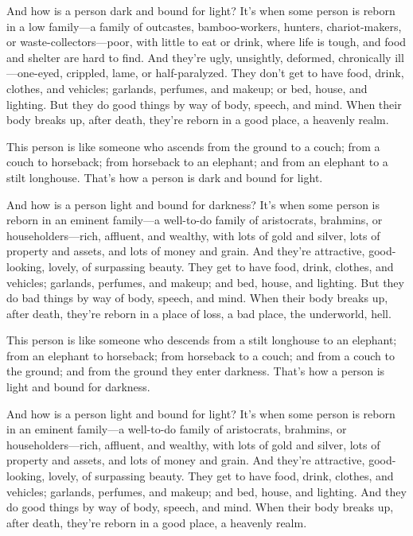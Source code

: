 \documentclass[12pt,openany]{book}%
\begin{document}
And how is a person dark and bound for light? It’s when some person is reborn in a low family—a family of outcastes, bamboo-workers, hunters, chariot-makers, or waste-collectors—poor, with little to eat or drink, where life is tough, and food and shelter are hard to find. And they’re ugly, unsightly, deformed, chronically ill—one-eyed, crippled, lame, or half-paralyzed. They don’t get to have food, drink, clothes, and vehicles; garlands, perfumes, and makeup; or bed, house, and lighting. But they do good things by way of body, speech, and mind. When their body breaks up, after death, they’re reborn in a good place, a heavenly realm. 

This person is like someone who ascends from the ground to a couch; from a couch to horseback; from horseback to an elephant; and from an elephant to a stilt longhouse. That’s how a person is dark and bound for light. 

And how is a person light and bound for darkness? It’s when some person is reborn in an eminent family—a well-to-do family of aristocrats, brahmins, or householders—rich, affluent, and wealthy, with lots of gold and silver, lots of property and assets, and lots of money and grain. And they’re attractive, good-looking, lovely, of surpassing beauty. They get to have food, drink, clothes, and vehicles; garlands, perfumes, and makeup; and bed, house, and lighting. But they do bad things by way of body, speech, and mind. When their body breaks up, after death, they’re reborn in a place of loss, a bad place, the underworld, hell. 

This person is like someone who descends from a stilt longhouse to an elephant; from an elephant to horseback; from horseback to a couch; and from a couch to the ground; and from the ground they enter darkness. That’s how a person is light and bound for darkness. 

And how is a person light and bound for light? It’s when some person is reborn in an eminent family—a well-to-do family of aristocrats, brahmins, or householders—rich, affluent, and wealthy, with lots of gold and silver, lots of property and assets, and lots of money and grain. And they’re attractive, good-looking, lovely, of surpassing beauty. They get to have food, drink, clothes, and vehicles; garlands, perfumes, and makeup; and bed, house, and lighting. And they do good things by way of body, speech, and mind. When their body breaks up, after death, they’re reborn in a good place, a heavenly realm. 
\end{document}
